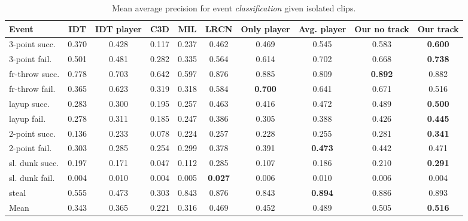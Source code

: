 \begin{table}[!htp]
\begin{center}
\small
 \begin{tabular}{|l|c|c|c|c|c|c|c|c|c|}
  \hline
Event & IDT\cite{Wang_CVPR11} & IDT\cite{Wang_CVPR11} player & C3D \cite{Tran_arxiv14} & MIL\cite{Andrews_NIPS02} &  LRCN \cite{Donahue_arxiv14} &Only player & Avg. player & Our no track & Our track \\ \hline \hline

  3-point succ.    & 0.370 & 0.428 & 0.117 & 0.237 & 0.462   & 0.469 & 0.545 & 0.583 & \textbf{0.600} \\
  3-point fail.    & 0.501 &  0.481& 0.282 & 0.335 & 0.564   & 0.614 & 0.702 & 0.668 & \textbf{0.738} \\
  fr-throw succ. & 0.778 &  0.703& 0.642   & 0.597 & 0.876   & 0.885 & 0.809 & \textbf{0.892} & 0.882 \\
  fr-throw fail. & 0.365 &  0.623& 0.319   & 0.318 & 0.584    & \textbf{0.700} & 0.641 & 0.671 & 0.516 \\
  layup succ.      & 0.283 & 0.300 & 0.195 & 0.257 & 0.463   & 0.416 & 0.472 & 0.489 & \textbf{0.500} \\
  layup fail.      & 0.278 &0.311  & 0.185 & 0.247 & 0.386   & 0.305 & 0.388 & 0.426 & \textbf{0.445} \\
  2-point succ.    & 0.136 &  0.233 & 0.078& 0.224 & 0.257    & 0.228 & 0.255 & 0.281 & \textbf{0.341} \\
  2-point fail.    & 0.303 &  0.285 & 0.254& 0.299 & 0.378   & 0.391 & \textbf{0.473} & 0.442 & 0.471 \\
  sl. dunk succ.  & 0.197 &  0.171 & 0.047 & 0.112 & 0.285   & 0.107 & 0.186 & 0.210 & \textbf{0.291} \\
  sl. dunk fail.  & 0.004 &  0.010 & 0.004 & 0.005 & \textbf{0.027} & 0.006 & 0.010 & 0.006 & 0.004 \\
  steal            & 0.555 &  0.473& 0.303 & 0.843 & 0.876 &  0.843 & \textbf{0.894} & 0.886 & 0.893 \\ \hline \hline
Mean             & 0.343 &  0.365 & 0.221  & 0.316 & 0.469 & 0.452 & 0.489 & 0.505 & \textbf{0.516} \\ \hline
  \end{tabular}
\end{center}
  \caption{Mean average precision for event {\em classification} given
    isolated clips.}
  \label{tab:event_class}
  \label{tab:class_res}
\end{table}


